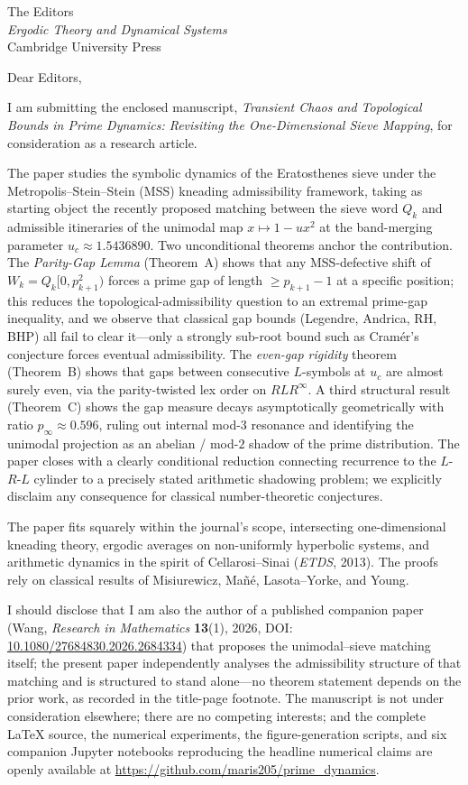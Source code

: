 \documentclass[11pt,a4paper]{letter}
\begin{document}
\begin{letter}{
The Editors \\
\emph{Ergodic Theory and Dynamical Systems} \\
Cambridge University Press
}

\opening{Dear Editors,}

I am submitting the enclosed manuscript, \emph{Transient Chaos and
Topological Bounds in Prime Dynamics: Revisiting the One-Dimensional
Sieve Mapping}, for consideration as a research article.

The paper studies the symbolic dynamics of the Eratosthenes sieve
under the Metropolis--Stein--Stein (MSS) kneading admissibility
framework, taking as starting object the recently proposed matching
between the sieve word $Q_k$ and admissible itineraries of the
unimodal map $x \mapsto 1 - u x^2$ at the band-merging parameter
$u_c \approx 1.5436890$. Two unconditional theorems anchor the
contribution. The \emph{Parity-Gap Lemma} (Theorem~A) shows that any
MSS-defective shift of $W_k = Q_k[0, p_{k+1}^2)$ forces a prime gap
of length $\geq p_{k+1} - 1$ at a specific position; this reduces
the topological-admissibility question to an extremal prime-gap
inequality, and we observe that classical gap bounds (Legendre,
Andrica, RH, BHP) all fail to clear it---only a strongly sub-root
bound such as Cram\'er's conjecture forces eventual admissibility.
The \emph{even-gap rigidity} theorem (Theorem~B) shows that gaps
between consecutive $L$-symbols at $u_c$ are almost surely even,
via the parity-twisted lex order on $RLR^\infty$. A third structural
result (Theorem~C) shows the gap measure decays asymptotically
geometrically with ratio $p_\infty \approx 0.596$, ruling out
internal mod-$3$ resonance and identifying the unimodal projection
as an abelian / mod-$2$ shadow of the prime distribution. The paper
closes with a clearly conditional reduction connecting recurrence
to the $L$-$R$-$L$ cylinder to a precisely stated arithmetic
shadowing problem; we explicitly disclaim any consequence for
classical number-theoretic conjectures.

The paper fits squarely within the journal's scope, intersecting
one-dimensional kneading theory, ergodic averages on non-uniformly
hyperbolic systems, and arithmetic dynamics in the spirit of
Cellarosi--Sinai (\emph{ETDS}, 2013). The proofs rely on classical
results of Misiurewicz, Ma\~n\'e, Lasota--Yorke, and Young.

I should disclose that I am also the author of a published companion
paper (Wang, \emph{Research in Mathematics} \textbf{13}(1), 2026,
DOI: \href{https://doi.org/10.1080/27684830.2026.2684334}{10.1080/27684830.2026.2684334})
that proposes the unimodal--sieve matching itself; the present paper
independently analyses the admissibility structure of that matching
and is structured to stand alone---no theorem statement depends on
the prior work, as recorded in the title-page footnote. The
manuscript is not under consideration elsewhere; there are no
competing interests; and the complete LaTeX source, the numerical
experiments, the figure-generation scripts, and six companion Jupyter
notebooks reproducing the headline numerical
claims are openly available at
\url{https://github.com/maris205/prime_dynamics}.


\end{letter}
\end{document}
